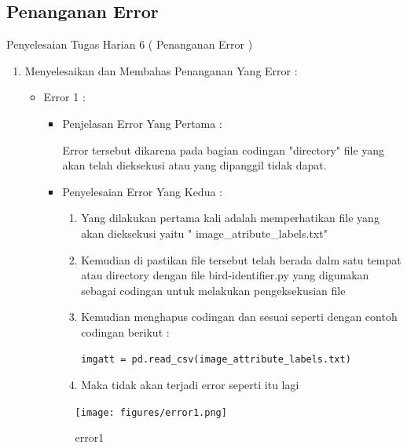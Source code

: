 \begin{enumerate}
\subsection{Penanganan Error}
Penyelesaian Tugas Harian 6 ( Penanganan Error )
\begin{enumerate}
\item Menyelesaikan dan Membahas Penanganan Yang Error :
\begin{itemize}
\item Error 1 :
\par 
\par
\begin{itemize}
\item Penjelasan Error Yang Pertama :
\par Error tersebut dikarena pada bagian codingan "directory" file yang akan telah dieksekusi atau yang dipanggil tidak dapat.
\item Penyelesaian Error Yang Kedua :
\begin{enumerate}
\item Yang dilakukan pertama kali adalah memperhatikan file yang akan dieksekusi yaitu " image\_atribute\_labels.txt" 
\item Kemudian di pastikan file tersebut telah berada dalm satu tempat atau directory dengan file bird-identifier.py yang digunakan sebagai codingan untuk melakukan pengeksekusian file
\item Kemudian menghapus codingan dan sesuai seperti dengan contoh codingan berikut :
\begin{lstlisting}
imgatt = pd.read_csv(image_attribute_labels.txt)
\end{lstlisting}
\par
\item Maka tidak akan terjadi error seperti itu lagi
\par
\end{enumerate}
\end{itemize}
\par
\par
\begin{figure}[ht]
\centering
\texttt{[image: figures/error1.png]}
\caption{error1}
\label{contoh}
\end{figure}
\par
\par
\par

\end{itemize}
\end{enumerate}
\end{enumerate}
